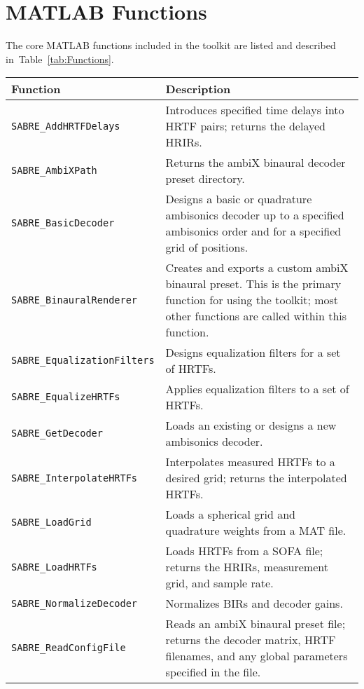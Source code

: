 \documentclass[11pt, oneside]{article}
\newcommand{\tabref}[1]{Table~\ref{#1}}
\begin{document}
\section{MATLAB Functions}\label{sec:Functions}
The core MATLAB functions included in the toolkit are listed and described in~\tabref{tab:Functions}.

\begin{table}
\centering
  \begin{tabular}{| l | p{11cm} |}
    \hline
    \textbf{Function} & \textbf{Description} \\ \hline
    \texttt{SABRE\_AddHRTFDelays} & Introduces specified time delays into HRTF pairs;
    	returns the delayed HRIRs. \\ \hline
    \texttt{SABRE\_AmbiXPath} & Returns the ambiX binaural decoder preset directory. \\ \hline
    \texttt{SABRE\_BasicDecoder} & Designs a basic or quadrature ambisonics decoder up to a specified ambisonics order and for a specified grid of positions. \\ \hline
    \texttt{SABRE\_BinauralRenderer} & Creates and exports a custom ambiX binaural preset.
    	This is the primary function for using the toolkit; most other functions are called within this function. \\ \hline
    \texttt{SABRE\_EqualizationFilters} & Designs equalization filters for a set of HRTFs. \\ \hline
    \texttt{SABRE\_EqualizeHRTFs} & Applies equalization filters to a set of HRTFs. \\ \hline
    \texttt{SABRE\_GetDecoder} & Loads an existing or designs a new ambisonics decoder. \\ \hline
    \texttt{SABRE\_InterpolateHRTFs} & Interpolates measured HRTFs to a desired grid;
    	returns the interpolated HRTFs. \\ \hline
    \texttt{SABRE\_LoadGrid} & Loads a spherical grid and quadrature weights from a MAT file. \\ \hline
    \texttt{SABRE\_LoadHRTFs} & Loads HRTFs from a SOFA file;
    	returns the HRIRs, measurement grid, and sample rate. \\ \hline
    \texttt{SABRE\_NormalizeDecoder} & Normalizes BIRs and decoder gains. \\ \hline
    \texttt{SABRE\_ReadConfigFile} & Reads an ambiX binaural preset file;
    	returns the decoder matrix, HRTF filenames, and any global parameters specified in the file. \\ \hline

\end{tabular}
\end{table}
\end{document}
